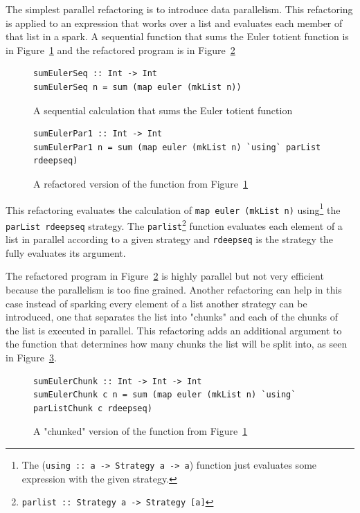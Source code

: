 The simplest parallel refactoring is to introduce data parallelism. This refactoring is applied to an expression that works over a list and evaluates each member of that list in a spark. A sequential function that sums the Euler totient function is in Figure~\ref{eulerSeq} and the refactored program is in Figure~\ref{eulerPar1}

\begin{figure}[t]
\begin{lstlisting}
sumEulerSeq :: Int -> Int
sumEulerSeq n = sum (map euler (mkList n))
\end{lstlisting}
\caption{A sequential calculation that sums the Euler totient function}
\label{eulerSeq}
\end{figure} 


\begin{figure}[t]
\begin{lstlisting}
sumEulerPar1 :: Int -> Int
sumEulerPar1 n = sum (map euler (mkList n) `using` parList rdeepseq)
\end{lstlisting}
\caption{A refactored version of the function from Figure~\ref{eulerSeq}}
\label{eulerPar1}
\end{figure} 
  
This refactoring evaluates the calculation of \texttt{map euler (mkList n)} using\footnote{The (\texttt{using :: a -> Strategy a -> a}) function just evaluates some expression with the given strategy.} the \texttt{parList rdeepseq} strategy. The \texttt{parlist}\footnote{\texttt{parlist :: Strategy a -> Strategy [a]}} function evaluates each element of a list in parallel according to a given strategy and \texttt{rdeepseq} is the strategy the fully evaluates its argument. 
  
The refactored program in Figure~\ref{eulerPar1} is highly parallel but not very efficient because the parallelism is too fine grained. Another refactoring can help in this case instead of sparking every element of a list another strategy can be introduced, one that separates the list into "chunks" and each of the chunks of the list is executed in parallel. This refactoring adds an additional argument to the function that determines how many chunks the list will be split into, as seen in Figure~\ref{eulerChunk}.
  
\begin{figure}[t]
\begin{lstlisting}
sumEulerChunk :: Int -> Int -> Int
sumEulerChunk c n = sum (map euler (mkList n) `using` parListChunk c rdeepseq)
\end{lstlisting}
\caption{A "chunked" version of the function from Figure~\ref{eulerSeq}}
\label{eulerChunk}
\end{figure}  

